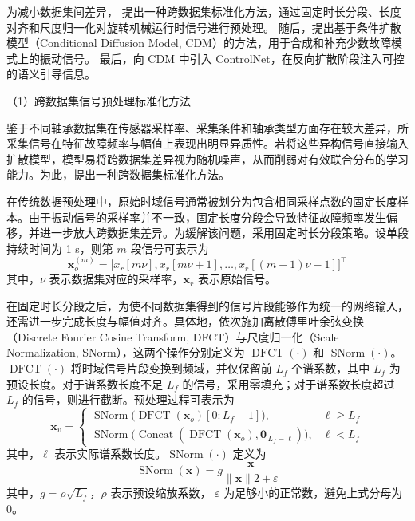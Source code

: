 为减小数据集间差异，
提出一种跨数据集标准化方法，通过固定时长分段、长度对齐和尺度归一化对旋转机械运行时信号进行预处理。
随后，提出基于条件扩散模型（Conditional Diffusion Model, CDM）的方法，用于合成和补充少数故障模式上的振动信号。
最后，向 CDM 中引入 ControlNet，在反向扩散阶段注入可控的语义引导信息。

（1）跨数据集信号预处理标准化方法

鉴于不同轴承数据集在传感器采样率、采集条件和轴承类型方面存在较大差异，所采集信号在特征故障频率与幅值上表现出明显异质性。若将这些异构信号直接输入扩散模型，模型易将跨数据集差异视为随机噪声，从而削弱对有效联合分布的学习能力。为此，提出一种跨数据集标准化方法。

在传统数据预处理中，原始时域信号通常被划分为包含相同采样点数的固定长度样本。由于振动信号的采样率并不一致，固定长度分段会导致特征故障频率发生偏移，并进一步放大跨数据集差异。为缓解该问题，采用固定时长分段策略。设单段持续时间为 1 s，则第 $m$ 段信号可表示为
\begin{equation}
\bm{x}_o^{(m)}=
\bigl[
x_r[m\nu], x_r[m\nu+1], \dots, x_r[(m+1)\nu-1]
\bigr]^{\top}
\end{equation}
其中，$\nu$ 表示数据集对应的采样率，$\bm{x}_r$ 表示原始信号。


在固定时长分段之后，为使不同数据集得到的信号片段能够作为统一的网络输入，还需进一步完成长度与幅值对齐。具体地，依次施加离散傅里叶余弦变换（Discrete Fourier Cosine Transform, DFCT）与尺度归一化（Scale Normalization, SNorm），这两个操作分别定义为 $\operatorname{DFCT}(\cdot)$ 和 $\operatorname{SNorm}(\cdot)$。$\operatorname{DFCT}(\cdot)$ 将时域信号片段变换到频域，并仅保留前 $L_f$ 个谱系数，其中 $L_f$ 为预设长度。对于谱系数长度不足 $L_f$ 的信号，采用零填充；对于谱系数长度超过 $L_f$ 的信号，则进行截断。预处理过程可表示为
% 
\begin{equation}
	\label{eq:dcn}
	\bm{x}_v =
	\begin{cases}
		\operatorname{SNorm}\bigl(\operatorname{DFCT}(\bm{x}_o)[0:L_{f} - 1]\bigr),      & \ell \ge L_{f} \\[4pt]
		\operatorname{SNorm}\bigl(\operatorname{Concat}(\operatorname{DFCT}(\bm{x}_o),\bm{0}_{\,L_{f}-\ell})\bigr), & \ell < L_{f}
	\end{cases}
\end{equation}
% 
其中，$\ell$ 表示实际谱系数长度。$\operatorname{SNorm}(\cdot)$ 定义为
% 
\begin{equation}
\label{eq:scalenorm}
\operatorname{SNorm}(\bm{x})=
g\frac{\bm{x}}{\lVert \bm{x}\rVert{2} + \varepsilon}
\end{equation}
% 
其中，$g=\rho\sqrt{L_f}$，$\rho$ 表示预设缩放系数， $\varepsilon$ 为足够小的正常数，避免上式分母为 0。

